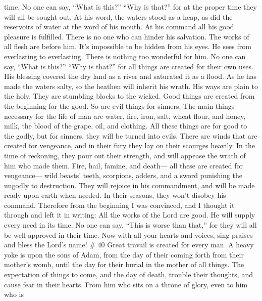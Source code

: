 time.  No one can say, ``What is this?'' ``Why is that?''
for at the proper time they will all be sought out. At his word, the
waters stood as a heap, as did the reservoirs of water at the word of
his mouth.  At his command all his good pleasure is
fulfilled. There is no one who can hinder his salvation. 
The works of all flesh are before him. It's impossible to be hidden from
his eyes.  He sees from everlasting to everlasting. There
is nothing too wonderful for him.  No one can say, ``What
is this?'' ``Why is that?'' for all things are created for their own
uses.  His blessing covered the dry land as a river and
saturated it as a flood.  As he has made the waters salty,
so the heathen will inherit his wrath.  His ways are plain
to the holy. They are stumbling blocks to the wicked.  Good
things are created from the beginning for the good. So are evil things
for sinners.  The main things necessary for the life of man
are water, fire, iron, salt, wheat flour, and honey, milk, the blood of
the grape, oil, and clothing.  All these things are for
good to the godly, but for sinners, they will be turned into evils.
 There are winds that are created for vengeance, and in
their fury they lay on their scourges heavily. In the time of reckoning,
they pour out their strength, and will appease the wrath of him who made
them.  Fire, hail, famine, and death--- all these are
created for vengeance---  wild beasts' teeth, scorpions,
adders, and a sword punishing the ungodly to destruction. 
They will rejoice in his commandment, and will be made ready upon earth
when needed. In their seasons, they won't disobey his command.
 Therefore from the beginning I was convinced, and I
thought it through and left it in writing:  All the works
of the Lord are good. He will supply every need in its time.
 No one can say, ``This is worse than that,'' for they will
all be well approved in their time.  Now with all your
hearts and voices, sing praises and bless the Lord's name! \# 40
 Great travail is created for every man. A heavy yoke is
upon the sons of Adam, from the day of their coming forth from their
mother's womb, until the day for their burial in the mother of all
things.  The expectation of things to come, and the day of
death, trouble their thoughts, and cause fear in their hearts.
 From him who sits on a throne of glory, even to him who is
